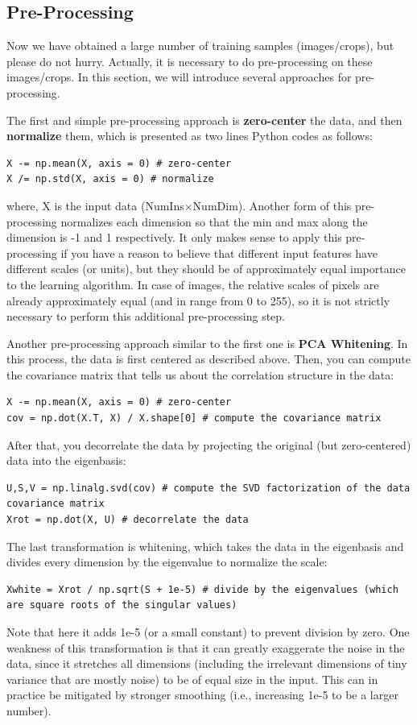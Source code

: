 \documentclass[11pt,fleqn, UTF8]{ctexbook} %
\begin{document}
\subsection{Pre-Processing}
Now we have obtained a large number of training samples (images/crops), but please do not hurry. Actually, it is necessary to do pre-processing on these images/crops. In this section, we will introduce several approaches for pre-processing.

The first and simple pre-processing approach is \textbf{zero-center} the data, and then \textbf{normalize} them, which is presented as two lines Python codes as follows:
\lstset{language=python}
\begin{lstlisting}[frame=single]
X -= np.mean(X, axis = 0) # zero-center
X /= np.std(X, axis = 0) # normalize
\end{lstlisting}
where, X is the input data (NumIns$\times$NumDim). Another form of this pre-processing normalizes each dimension so that the min and max along the dimension is -1 and 1 respectively. It only makes sense to apply this pre-processing if you have a reason to believe that different input features have different scales (or units), but they should be of approximately equal importance to the learning algorithm. In case of images, the relative scales of pixels are already approximately equal (and in range from 0 to 255), so it is not strictly necessary to perform this additional pre-processing step.

Another pre-processing approach similar to the first one is \textbf{PCA Whitening}. In this process, the data is first centered as described above. Then, you can compute the covariance matrix that tells us about the correlation structure in the data:
\lstset{language=python}
\begin{lstlisting}[frame=single]
X -= np.mean(X, axis = 0) # zero-center
cov = np.dot(X.T, X) / X.shape[0] # compute the covariance matrix
\end{lstlisting}
After that, you decorrelate the data by projecting the original (but zero-centered) data into the eigenbasis:
\lstset{language=python}
\begin{lstlisting}[frame=single]
U,S,V = np.linalg.svd(cov) # compute the SVD factorization of the data covariance matrix
Xrot = np.dot(X, U) # decorrelate the data
\end{lstlisting}
The last transformation is whitening, which takes the data in the eigenbasis and divides every dimension by the eigenvalue to normalize the scale:
\lstset{language=python}
\begin{lstlisting}[frame=single]
Xwhite = Xrot / np.sqrt(S + 1e-5) # divide by the eigenvalues (which are square roots of the singular values)
\end{lstlisting}
Note that here it adds 1e-5 (or a small constant) to prevent division by zero. One weakness of this transformation is that it can greatly exaggerate the noise in the data, since it stretches all dimensions (including the irrelevant dimensions of tiny variance that are mostly noise) to be of equal size in the input. This can in practice be mitigated by stronger smoothing (i.e., increasing 1e-5 to be a larger number).
\end{document}
